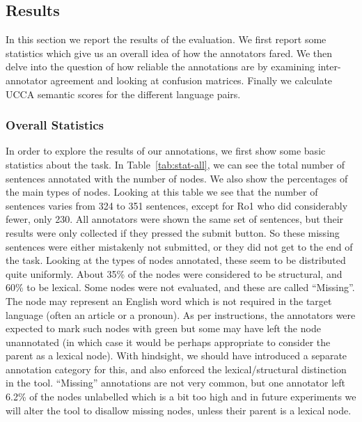 \documentclass[11pt]{article}
\begin{document}
\subsection{Results}


In this section we report the results of the evaluation. We first report some statistics which give us an overall idea
of how the annotators fared. We then delve into the question of how reliable the annotations are by examining
inter-annotator agreement and looking at confusion matrices. Finally we calculate UCCA semantic scores
for the different language pairs.  

\subsubsection{Overall Statistics}

In order to explore the results of our annotations, we first show some basic statistics
about the task. In Table~\ref{tab:stat-all}, we can see the total number of sentences annotated
%
with
the number of nodes. We also show the percentages of the main types of nodes.
Looking at this table we see that the number of sentences varies from 324 to 351 sentences,
except for Ro1 who did considerably fewer, only 230. 
All annotators were shown the same set of sentences, but their results were only
collected if they pressed the submit button. So these missing sentences were either mistakenly
not submitted, or they did not get to the end of the task. 
Looking at the types of nodes annotated, these seem to be distributed quite uniformly.
About 35\% of the nodes were considered to be structural, and 60\% to be lexical.
Some nodes were not evaluated, and these are called ``Missing''. 
The node may represent an English
word which is not required in the target language (often an article or a
pronoun).
As per instructions, the annotators were expected to mark such nodes with green
but some may have left the node unannotated (in which case it would be perhaps
appropriate to consider the parent as a lexical node).
With hindsight, we should have introduced a separate annotation category for this, and
also enforced the lexical/structural distinction in the tool. ``Missing''
annotations are not very common, but
one annotator left 6.2\% of the nodes unlabelled which is a bit too high and in 
future experiments we will alter the tool to disallow missing nodes, unless their parent is a lexical node. 
\end{document}
